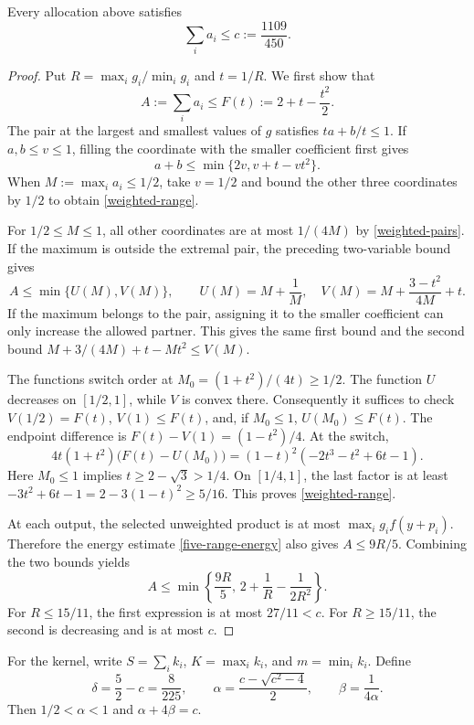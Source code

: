 \begin{lemma}\label{weighted-total}
Every allocation above satisfies
\[
 \sum_i a_i\le c:=\frac{1109}{450}.
\]
\end{lemma}
\begin{proof}
Put $R=\max_i g_i/\min_i g_i$ and $t=1/R$. We first show that
\begin{equation}\label{weighted-range}
 A:=\sum_i a_i\le F(t):=2+t-\frac{t^2}{2}.
\end{equation}
The pair at the largest and smallest values of $g$ satisfies
$ta+b/t\le1$. If $a,b\le v\le1$, filling the coordinate with
the smaller coefficient first gives
\[
 a+b\le\min\{2v,v+t-vt^2\}.
\]
When $M:=\max_i a_i\le1/2$, take $v=1/2$ and bound the other
three coordinates by $1/2$ to obtain \eqref{weighted-range}.

For $1/2\le M\le1$, all other coordinates are at most $1/(4M)$
by \eqref{weighted-pairs}. If the maximum is outside the extremal
pair, the preceding two-variable bound gives
\[
 A\le\min\{U(M),V(M)\},\qquad
 U(M)=M+\frac1M,\quad V(M)=M+\frac{3-t^2}{4M}+t.
\]
If the maximum belongs to the pair, assigning it to the smaller
coefficient can only increase the allowed partner. This gives the
same first bound and the second bound
$M+3/(4M)+t-Mt^2\le V(M)$.

The functions switch order at $M_0=(1+t^2)/(4t)\ge1/2$.
The function $U$ decreases on $[1/2,1]$, while $V$ is convex there.
Consequently it suffices to check $V(1/2)=F(t)$,
$V(1)\le F(t)$, and, if $M_0\le1$, $U(M_0)\le F(t)$.
The endpoint difference is $F(t)-V(1)=(1-t^2)/4$. At the switch,
\[
 4t(1+t^2)\bigl(F(t)-U(M_0)\bigr)
 =(1-t)^2(-2t^3-t^2+6t-1).
\]
Here $M_0\le1$ implies $t\ge2-\sqrt3>1/4$. On $[1/4,1]$,
the last factor is at least
$-3t^2+6t-1=2-3(1-t)^2\ge5/16$. This proves
\eqref{weighted-range}.

At each output, the selected unweighted product is at most
$\max_i g_i f(y+p_i)$. Therefore the energy estimate
\eqref{five-range-energy} also gives $A\le9R/5$. Combining the
two bounds yields
\[
 A\le\min\left\{\frac{9R}{5},\,
                  2+\frac1R-\frac1{2R^2}\right\}.
\]
For $R\le15/11$, the first expression is at most $27/11<c$.
For $R\ge15/11$, the second is decreasing and is at most $c$.
\end{proof}

For the kernel, write $S=\sum_i k_i$, $K=\max_i k_i$, and
$m=\min_i k_i$. Define
\[
 \delta=\frac52-c=\frac8{225},\qquad
 \alpha=\frac{c-\sqrt{c^2-4}}2,\qquad
 \beta=\frac1{4\alpha}.
\]
Then $1/2<\alpha<1$ and $\alpha+4\beta=c$.

